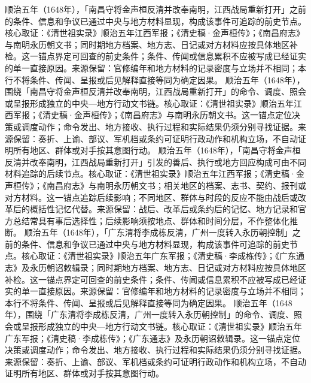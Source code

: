 顺治五年（1648年），「南昌守将金声桓反清并改奉南明，江西战局重新打开」之前的条件、信息和争议已通过中央与地方材料显现，构成该事件可追踪的前史节点。核心取证：《清世祖实录》顺治五年江西军报；《清史稿·金声桓传》；《南昌府志》与南明永历朝文书；同时期地方档案、地方志、日记或对方材料应按具体地区补检。这一锚点界定可回查的前史条件；条件、传闻或信息累积不应被写成已经证实的单一直接原因。来源保留：官修编年和地方材料的记录密度与立场并不相同；本行不将条件、传闻、呈报或后见解释直接等同为确定因果。
顺治五年（1648年），围绕「南昌守将金声桓反清并改奉南明，江西战局重新打开」的命令、调度、照会或呈报形成独立的中央—地方行动文书链。核心取证：《清世祖实录》顺治五年江西军报；《清史稿·金声桓传》；《南昌府志》与南明永历朝文书。这一锚点定位决策或调度动作；命令发出、地方接收、执行过程和实际结果仍须分别寻找证据。来源保留：奏折、上谕、部议、军机档或条约可证明行政动作和机构立场，不自动证明所有地区、群体或对手按其意图行动。
顺治五年（1648年），「南昌守将金声桓反清并改奉南明，江西战局重新打开」引发的善后、执行或地方回应构成可由不同材料追踪的后续节点。核心取证：《清世祖实录》顺治五年江西军报；《清史稿·金声桓传》；《南昌府志》与南明永历朝文书；相关地区的档案、志书、契约、报刊或对方材料。这一锚点追踪后续影响；不同地区、群体与时段的反应不能由战后或改革后的概括性记忆代替。来源保留：战后、改革后或条约后的记忆、地方记录和官方总结常具有事后选择性；后续影响须按地点、群体和时间分层，不作整体化推断。
顺治五年（1648年），「广东清将李成栋反清，广州一度转入永历朝控制」之前的条件、信息和争议已通过中央与地方材料显现，构成该事件可追踪的前史节点。核心取证：《清世祖实录》顺治五年广东军报；《清史稿·李成栋传》；《广东通志》及永历朝诏敕辑录；同时期地方档案、地方志、日记或对方材料应按具体地区补检。这一锚点界定可回查的前史条件；条件、传闻或信息累积不应被写成已经证实的单一直接原因。来源保留：官修编年和地方材料的记录密度与立场并不相同；本行不将条件、传闻、呈报或后见解释直接等同为确定因果。
顺治五年（1648年），围绕「广东清将李成栋反清，广州一度转入永历朝控制」的命令、调度、照会或呈报形成独立的中央—地方行动文书链。核心取证：《清世祖实录》顺治五年广东军报；《清史稿·李成栋传》；《广东通志》及永历朝诏敕辑录。这一锚点定位决策或调度动作；命令发出、地方接收、执行过程和实际结果仍须分别寻找证据。来源保留：奏折、上谕、部议、军机档或条约可证明行政动作和机构立场，不自动证明所有地区、群体或对手按其意图行动。
